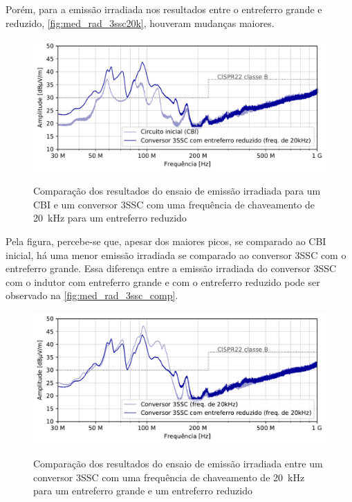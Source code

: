     Porém, para a emissão irradiada nos resultados entre o entreferro grande e reduzido, \autoref{fig:med_rad_3ssc20k}, houveram mudanças maiores. 
    
    \begin{figure}[H]
    	\centering
    	\caption{Comparação dos resultados do ensaio de emissão irradiada para um CBI e um conversor 3SSC com uma frequência de chaveamento de \qty{20}{\kilo\hertz} para um entreferro reduzido}
    	\includegraphics[scale=.9]{pdf/rad/Conversor 3SSC com entreferro reduzido (freq. de 20kHz).pdf}
    	\label{fig:med_rad_3ssc20k}
    \end{figure}
    
    Pela figura, percebe-se que, apesar dos maiores picos, se comparado ao CBI inicial, há uma menor emissão irradiada se comparado ao conversor 3SSC com o entreferro grande. Essa diferença entre a emissão irradiada do conversor 3SSC com o indutor com entreferro grande e com o entreferro reduzido pode ser observado na \autoref{fig:med_rad_3ssc_comp}. 
    
    \begin{figure}[H]
    	\centering
    	\caption{Comparação dos resultados do ensaio de emissão irradiada entre um conversor 3SSC com uma frequência de chaveamento de \qty{20}{\kilo\hertz} para um entreferro grande e um entreferro reduzido}
    	\includegraphics[scale=.9]{pdf/rad/rad-Conversor 3SSC (freq. de 20kHz)-Conversor 3SSC com entreferro reduzido (freq. de 20kHz).pdf}
    	\label{fig:med_rad_3ssc_comp}
    \end{figure}
    
